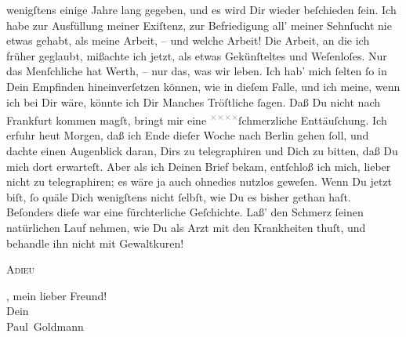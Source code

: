 \begin{ledgroupsized}[t]{13cm}
               wenigſtens einige Jahre lang gegeben, und es wird Dir \strikeout{\textcolor{gray}{wie}} wieder beſchieden ſein. Ich habe zur Ausfüllung meiner Exiſtenz, zur
               Befriedigung all’ meiner Sehnſucht nie etwas gehabt, als meine Arbeit, – und welche
               Arbeit! Die Arbeit, an die ich früher geglaubt, mißachte ich jetzt, als etwas
               Gekünſteltes und Weſenloſes. Nur das Menſchliche hat Werth, – nur das, was wir
               leben.\pend
           \pstart
           Ich hab’ mich ſelten ſo in Dein \strikeout{\textcolor{gray}{×}}{ }{\pb}Empfinden hineinverſetzen können, wie \strikeout{\textcolor{gray}{gege}} in dieſem Falle, und ich meine, wenn ich bei Dir wäre, könnte ich Dir \strikeout{\textcolor{gray}{m}} Manches Tröſtliche ſagen. Daß Du nicht nach Frankfurt kommen magſt, bringt mir eine \substVorne{}\textsuperscript{\textcolor{gray}{×}\-\textcolor{gray}{×}\-\textcolor{gray}{×}\-\textcolor{gray}{×}}\substDazwischen{}ſchmerzliche\substHinten{} Enttäuſchung. Ich erfuhr heut{ }Morgen, daß ich Ende dieſer Woche nach Berlin gehen ſoll, und dachte einen Augenblick daran, Dirs zu telegraphiren
               und \introOben{}Dich\introOben{} zu bitten,  daß
               Du mich dort erwarteſt. Aber  als ich Deinen Brief bekam, entſchloß ich mich, lieber nicht zu telegraphiren;
               es wäre ja auch ohnedies nutzlos geweſen.\pend
           \pstart
           Wenn Du jetzt \label{K_L02874-33v}\label{K_L02874-33h}{ } biſt, ſo quäle Dich
               wenigſtens nicht ſelbſt, wie Du es bisher gethan haſt. Beſonders {\pb}dieſe \label{K_L02874-23v}\label{K_L02874-23h} war eine fürchterliche Geſchichte. Laß’ den Schmerz ſeinen natürlichen Lauf
               nehmen, wie Du als Arzt mit den Krankheiten thuſt, und behandle ihn nicht mit
               Gewaltkuren!\pend
           \pstart
           \begin{otherlanguage}{french}\textsc{Adieu}\end{otherlanguage}, mein lieber Freund! {\\[\baselineskip]}Dein {\\[\baselineskip]}\spacefill\mbox{Paul Goldmann}\pend

\end{ledgroupsized}
